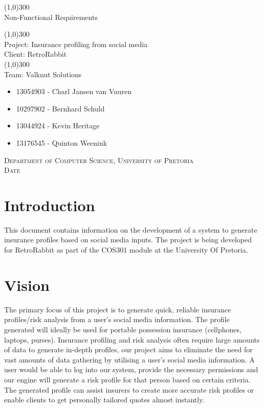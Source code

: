 \documentclass{article}
\begin{document}
	\begin{titlepage}
		\begin{center}
		
			\line(1,0){300}\\
			[6mm]
			\huge{
			Non-Functional Requirements\\
			}
			
			\line(1,0){300}\\
			\huge{Project: Insurance profiling from social media\\
			Client: RetroRabbit} \\
			\line(1,0){300}\\
			\huge{Team: Valknut Solutions}
			
			\large
			{
			\begin{itemize}
			
				\item 13054903 - Charl Jansen van Vuuren 
				\item 10297902 - Bernhard Schuld      
				\item 13044924 - Kevin Heritage
				\item 13176545 - Quinton Weenink
			\end{itemize}
			}
		\textsc{\large  Department of Computer Science, University of Pretoria}\\
		[0.5cm]
		\textsc{\large Date}	
		\end{center}

			
	\end{titlepage}
	\cleardoublepage
	\tableofcontents
	\cleardoublepage
\section{Introduction}
This document contains information on the development of a system to generate insurance profiles based on social media inputs. The project is being developed for RetroRabbit as part of the COS301 module at the University Of Pretoria.
\section{Vision}
The primary focus of this project is to generate quick, reliable insurance profiles/risk analysis from a user's social media information. The profile generated will ideally be used for portable possession insurance (cellphones, laptops, purses). Insurance profiling and risk analysis often require large amounts of data to generate in-depth profiles, our project aims to eliminate the need for vast amounts of data gathering by utilising a user's social media information. A user would be able to log into our system, provide the necessary permissions and our engine will generate a risk profile for that person based on certain criteria. The generated profile can assist insurers to create more accurate risk profiles or enable clients to get personally tailored quotes almost instantly.
\end{document}
